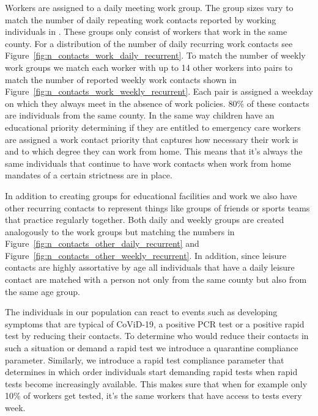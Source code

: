 Workers are assigned to a daily meeting work group. The group sizes vary to match the
number of daily repeating work contacts reported by working individuals in
\cite{Mossong2008}. These groups only consist of workers that work in the same county.
For a distribution of the number of daily recurring work contacts see
Figure~\ref{fig:n_contacts_work_daily_recurrent}. To match the number of weekly work groups
we match each worker with up to 14 other workers into pairs to match the number of
reported weekly work contacts shown in Figure~\ref{fig:n_contacts_work_weekly_recurrent}.
Each pair is assigned a weekday on which they always meet in the absence of work
policies. 80\% of these contacts are individuals from the same county.
In the same way children have an educational priority determining if they are entitled to
emergency care workers are assigned a work contact priority that captures how necessary
their work is and to which degree they can work from home. This means that it's always
the same individuals that continue to have work contacts when work from home mandates of
a certain strictness are in place.

In addition to creating groups for educational facilities and work we also have other
recurring contacts to represent things like groups of friends or sports teams that
practice regularly together. Both daily and weekly groups are created analogously to the
work groups but matching the numbers in Figure~\ref{fig:n_contacts_other_daily_recurrent} and
Figure~\ref{fig:n_contacts_other_weekly_recurrent}. In addition, since leisure contacts are
highly assortative by age all individuals that have a daily leisure contact are matched
with a person not only from the same county but also from the same age group.

The individuals in our population can react to events such as developing symptoms that
are typical of CoViD-19, a positive PCR test or a positive rapid test by reducing their
contacts. To determine who would reduce their contacts in such a situation or demand a
rapid test we introduce a quarantine compliance parameter. Similarly, we introduce a
rapid test compliance parameter that determines in which order individuals start
demanding rapid tests when rapid tests become increasingly available. This makes sure
that when for example only 10\% of workers get tested, it's the same workers that have
access to tests every week.


